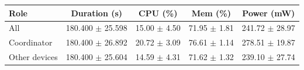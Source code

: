 \begin{tabular}{lcccc}
\hline
\textbf{Role} & \textbf{Duration (s)} & \textbf{CPU (\%)} & \textbf{Mem (\%)} & \textbf{Power (mW)} \\
\hline
All & 180.400 $\pm$ 25.598 & 15.00 $\pm$ 4.50 & 71.95 $\pm$ 1.81 & 241.72 $\pm$ 28.97 \\
Coordinator & 180.400 $\pm$ 26.892 & 20.72 $\pm$ 3.09 & 76.61 $\pm$ 1.14 & 278.51 $\pm$ 19.87 \\
Other devices & 180.400 $\pm$ 25.604 & 14.59 $\pm$ 4.31 & 71.62 $\pm$ 1.32 & 239.10 $\pm$ 27.74 \\
\hline
\end{tabular}
